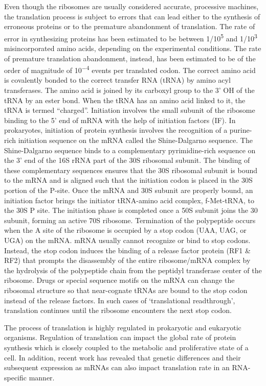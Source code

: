 Even though the ribosomes are usually considered accurate, processive machines, the translation process is subject to errors that can lead either to the synthesis of erroneous proteins or to the premature abandonment of translation. The rate of error in synthesizing proteins has been estimated to be between 1/10\textsuperscript{5} and 1/10\textsuperscript{3} misincorporated amino acids, depending on the experimental conditions. The rate of premature translation abandonment, instead, has been estimated to be of the order of magnitude of 10\textsuperscript{−4} events per translated codon. The correct amino acid is covalently bonded to the correct transfer RNA (tRNA) by amino acyl transferases. The amino acid is joined by its carboxyl group to the 3' OH of the tRNA by an ester bond. When the tRNA has an amino acid linked to it, the tRNA is termed ``charged''. Initiation involves the small subunit of the ribosome binding to the 5' end of mRNA with the help of initiation factors (IF). In prokaryotes, initiation of protein synthesis involves the recognition of a purine-rich initiation sequence on the mRNA called the Shine-Dalgarno sequence. The Shine-Dalgarno sequence binds to a complementary pyrimidine-rich sequence on the 3' end of the 16S rRNA part of the 30S ribosomal subunit. The binding of these complementary sequences ensures that the 30S ribosomal subunit is bound to the mRNA and is aligned such that the initiation codon is placed in the 30S portion of the P-site. Once the mRNA and 30S subunit are properly bound, an initiation factor brings the initiator tRNA-amino acid complex, f-Met-tRNA, to the 30S P site. The initiation phase is completed once a 50S subunit joins the 30 subunit, forming an active 70S ribosome. Termination of the polypeptide occurs when the A site of the ribosome is occupied by a stop codon (UAA, UAG, or UGA) on the mRNA. mRNA usually cannot recognize or bind to stop codons. Instead, the stop codon induces the binding of a release factor protein (RF1 \& RF2) that prompts the disassembly of the entire ribosome/mRNA complex by the hydrolysis of the polypeptide chain from the peptidyl transferase center of the ribosome. Drugs or special sequence motifs on the mRNA can change the ribosomal structure so that near-cognate tRNAs are bound to the stop codon instead of the release factors. In such cases of `translational readthrough', translation continues until the ribosome encounters the next stop codon.

The process of translation is highly regulated in prokaryotic and eukaryotic organisms. Regulation of translation can impact the global rate of protein synthesis which is closely coupled to the metabolic and proliferative state of a cell. In addition, recent work has revealed that genetic differences and their subsequent expression as mRNAs can also impact translation rate in an RNA-specific manner.

